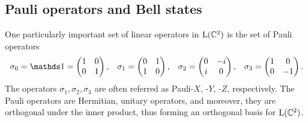 \subsection{Pauli operators and Bell states}
One particularly important set of linear operators in $\mathrm{L}(\mathbb{C}^{2})$ is 
the set of Pauli operators
\begin{equation} 
\label{eq:Pauli-operators}
  \begin{array}{llll}
    \sigma_{0} = \I = \begin{pmatrix} 1 & 0  \\ 0 & 1  \end{pmatrix}, & 
    \sigma_{1} = \begin{pmatrix} 0 & 1  \\ 1 & 0  \end{pmatrix}, & 
    \sigma_{2} = \begin{pmatrix} 0 & -i \\ i & 0  \end{pmatrix}, & 
    \sigma_{3} = \begin{pmatrix} 1 & 0  \\ 0 & -1 \end{pmatrix}.
  \end{array}
\end{equation}
The operators $\sigma_{1},\sigma_{2},\sigma_{3}$ are often referred as Pauli-$X$, -$Y$, -$Z$, respectively. 
The Pauli operators are Hermitian, unitary operators, and moreover,
they are orthogonal under the inner product, thus forming an orthogonal basis for
$\mathrm{L}(\mathbb{C}^{2})$.

